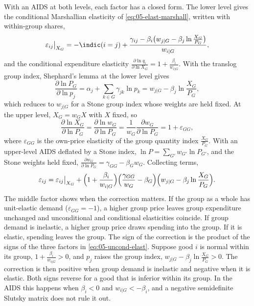 With an AIDS at both levels, each factor has a closed form. The lower level gives the conditional
Marshallian elasticity of \eqref{eq:05-elast-marshall}, written with within-group shares,
\begin{equation*}
  \varepsilon_{ij}\big|_{X_G} = -\indic(i = j)
  + \frac{\gamma_{ij} - \beta_i\bigl(w_{j|G} - \beta_j\ln\frac{X_G}{P_G}\bigr)}{w_{i|G}},
\end{equation*}
and the conditional expenditure elasticity $\frac{\partial\ln q_i}{\partial\ln X_G} = 1 +
\frac{\beta_i}{w_{i|G}}$. With the translog group index, Shephard's lemma at the lower level gives
\begin{equation*}
  \frac{\partial\ln P_G}{\partial\ln p_j} = \alpha_j + \sum_{k\in G}\gamma_{jk}\ln p_k
  = w_{j|G} - \beta_j\ln\frac{X_G}{P_G},
\end{equation*}
which reduces to $w_{j|G}$ for a Stone group index whose weights are held fixed. At the upper level,
$X_G = w_G X$ with $X$ fixed, so
\begin{equation}\label{eq:05-dlnXG}
  \frac{\partial\ln X_G}{\partial\ln P_G} = \frac{\partial\ln w_G}{\partial\ln P_G}
  = \frac{1}{w_G}\frac{\partial w_G}{\partial\ln P_G} = 1 + \varepsilon_{GG},
\end{equation}
where $\varepsilon_{GG}$ is the own-price elasticity of the group quantity index $\frac{X_G}{P_G}$. With
an upper-level AIDS deflated by a Stone index, $\ln P = \sum_{G'} w_{G'}\ln P_{G'}$, and the Stone weights
held fixed, $\frac{\partial w_G}{\partial\ln P_G} = \gamma_{GG} - \beta_G w_G$. Collecting terms,
\begin{equation}\label{eq:05-uncond-aids}
  \varepsilon_{ij} = \varepsilon_{ij}\big|_{X_G}
  + \Bigl(1 + \frac{\beta_i}{w_{i|G}}\Bigr)\Bigl(\frac{\gamma_{GG}}{w_G} - \beta_G\Bigr)
    \Bigl(w_{j|G} - \beta_j\ln\frac{X_G}{P_G}\Bigr).
\end{equation}
The middle factor shows when the correction matters. If the group as a whole has unit-elastic demand
($\varepsilon_{GG} = -1$), a higher group price leaves group expenditure unchanged and unconditional and
conditional elasticities coincide. If group demand is inelastic, a higher group price draws spending into
the group. If it is elastic, spending leaves the group. The sign of the correction is the product of the
signs of the three factors in \eqref{eq:05-uncond-elast}. Suppose good $i$ is normal within its group, $1
+ \frac{\beta_i}{w_{i|G}} > 0$, and $p_j$ raises the group index, $w_{j|G} - \beta_j\ln\frac{X_G}{P_G} >
0$. The correction is then positive when group demand is inelastic and negative when it is elastic. Both
signs reverse for a good that is inferior within its group. In the AIDS this happens when $\beta_i < 0$
and $w_{i|G} < -\beta_i$, and a negative semidefinite Slutsky matrix does not rule it out.

